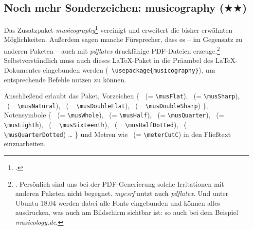%
%
%



\subsection{Noch mehr Sonderzeichen: musicography ($\bigstar\bigstar$)}

Das Zusatzpaket \textit{musicography}\footcite[vgl.][\nopage
wp]{CtanMusicography2018a} vereinigt und erweitert die bisher erwähnten
Möglichkeiten. Außerdem sagen manche Fürsprecher, dass es -- im Gegensatz zu
anderen Paketen -- auch mit \textit{pdflatex} druckfähige PDF-Dateien
erzeuge.\footnote{\cite[Vgl. dazu etwa][1]{Cashner2018a}. Persönlich sind uns bei
der PDF-Generierung solche Irritationen mit anderen Paketen nicht begegnet.
\textit{mycsrf} nutzt auch \textit{pdflatex}. Und unter Ubuntu 18.04 werden dabei
alle Fonts eingebunden und können alles ausdrucken, was auch am Bildschirm
sichtbar ist: so auch bei dem Beispiel \textit{musicology.de}.}
Selbstverständlich muss auch dieses \LaTeX-Paket in die Präambel des
\LaTeX-Dokumentes eingebunden werden (\texttt{\small
\textbackslash{usepackage\{musicography\}}}), um entsprechende Befehle nutzen zu
können.

Anschließend erlaubt das Paket, Vorzeichen \{
\musFlat \ (= \texttt{\small \textbackslash{musFlat}}),
\musSharp \ (= \texttt{\small \textbackslash{musSharp}}),
\musNatural \ (= \texttt{\small \textbackslash{musNatural}}),
\musDoubleFlat \ (= \texttt{\small \textbackslash{musDoubleFlat}}),
\musDoubleSharp \ (= \texttt{\small \textbackslash{musDoubleSharp}})
\}, Notensymbole \{
\musWhole \ (= \texttt{\small \textbackslash{musWhole}}),
\musHalf \ (= \texttt{\small \textbackslash{musHalf}}),
\musQuarter \ (= \texttt{\small \textbackslash{musQuarter}}),
\musEighth \ (= \texttt{\small \textbackslash{musEighth}}),
\musSixteenth \ (= \texttt{\small \textbackslash{musSixteenth}}),
\musHalfDotted \ (= \texttt{\small \textbackslash{musHalfDotted}}),
\musQuarterDotted \ (= \texttt{\small \textbackslash{musQuarterDotted}})
\ldots
\}
und Metren wie \meterCutC \ (= \texttt{\small \textbackslash{meterCutC}})
in den Fließtext einzuarbeiten.

